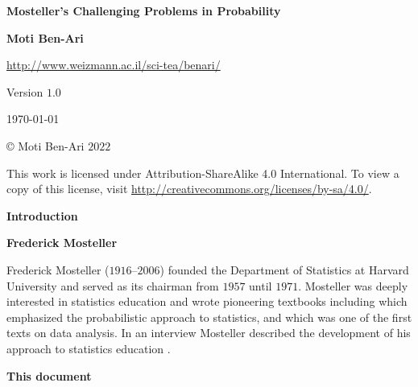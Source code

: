 

\thispagestyle{empty}

\begin{center}
\textbf{\LARGE Mosteller's Challenging Problems in Probability}

\bigskip
\bigskip
\bigskip

\textbf{\Large Moti Ben-Ari}

\bigskip

\url{http://www.weizmann.ac.il/sci-tea/benari/}

\bigskip
\bigskip
\bigskip

Version $1.0$

\bigskip

\today

\end{center}

\vfill

\begin{center}
\copyright{} Moti Ben-Ari $2022$
 \end{center}
 
\begin{small}
This work is licensed under Attribution-ShareAlike 4.0 International. To view a copy of this license, visit \url{http://creativecommons.org/licenses/by-sa/4.0/}.
\end{small}
\newpage

\tableofcontents

\newpage


\begin{center}
\textbf{\LARGE Introduction}
\end{center}


\bigskip

\textbf{Frederick Mosteller}

Frederick Mosteller ($1916$--$2006$) founded the Department of Statistics at Harvard University and served as its chairman from $1957$ until $1971$. Mosteller was deeply interested in statistics education and wrote pioneering textbooks including \cite{pwsa} which emphasized the probabilistic approach to statistics, and \cite{bsda} which was one of the first texts on data analysis. In an interview Mosteller described the development of his approach to statistics education \cite{gse}.

\textbf{This document}

